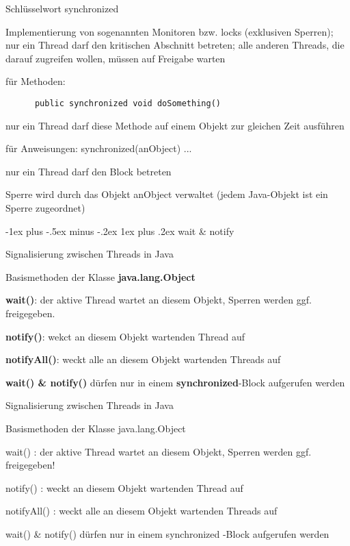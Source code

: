 \documentclass[10pt]{article}
\makeatletter
\renewcommand{\subsubsection}{\@startsection{subsubsection}{3}{0mm}%
                                {-1ex plus -.5ex minus -.2ex}%
                                {1ex plus .2ex}%
                                {\normalfont\small\bfseries}}
\makeatother
\begin{document}
\begin{itemize*}
  \item Schlüsselwort synchronized
  \begin{itemize*}
    \item Implementierung von sogenannten Monitoren bzw. locks (exklusiven Sperren); nur ein Thread darf den kritischen Abschnitt betreten; alle anderen Threads, die darauf zugreifen wollen, müssen auf Freigabe warten
    \item für Methoden:
    \begin{lstlisting}
      public synchronized void doSomething()
  \end{lstlisting}
    \begin{itemize*}
      \item nur ein Thread darf diese Methode auf einem Objekt zur gleichen Zeit ausführen
    \end{itemize*}
    \item für Anweisungen: synchronized(anObject) { ... }
    \begin{itemize*}
      \item nur ein Thread darf den Block betreten
      \item Sperre wird durch das Objekt anObject verwaltet (jedem Java-Objekt ist ein Sperre zugeordnet)
    \end{itemize*}
  \end{itemize*}
\end{itemize*}

\subsubsection{wait \& notify}
\begin{itemize*}
  \item Signalisierung zwischen Threads in Java
  \item Basismethoden der Klasse \textbf{java.lang.Object}
  \item \textbf{wait()}: der aktive Thread wartet an diesem Objekt, Sperren werden ggf. freigegeben.
  \item \textbf{notify()}: wekct an diesem Objekt wartenden Thread auf
  \item \textbf{notifyAll()}: weckt alle an diesem Objekt wartenden Threads auf
  \item \textbf{wait() \& notify()} dürfen nur in einem \textbf{synchronized}-Block aufgerufen werden
\end{itemize*}

\begin{itemize*}
  \item Signalisierung zwischen Threads in Java
  \item Basismethoden der Klasse java.lang.Object
  \item wait() : der aktive Thread wartet an diesem Objekt, Sperren werden ggf. freigegeben!
  \item notify() : weckt an diesem Objekt wartenden Thread auf
  \item notifyAll() : weckt alle an diesem Objekt wartenden Threads auf
  \item wait() \& notify() dürfen nur in einem synchronized -Block aufgerufen werden
\end{itemize*}
\end{document}
